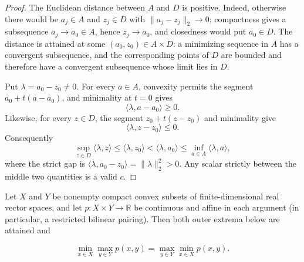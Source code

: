 \begin{proof}
The Euclidean distance between $A$ and $D$ is positive.  Indeed, otherwise
there would be $a_j\in A$ and $z_j\in D$ with
$\lVert a_j-z_j\rVert_2\to0$; compactness gives a subsequence
$a_j\to a_0\in A$, hence $z_j\to a_0$, and closedness would put
$a_0\in D$.  The distance is attained at some
$(a_0,z_0)\in A\times D$: a minimizing sequence in $A$ has a convergent
subsequence, and the corresponding points of $D$ are bounded and therefore
have a convergent subsequence whose limit lies in $D$.

Put $\lambda=a_0-z_0\ne0$.  For every $a\in A$, convexity permits the
segment $a_0+t(a-a_0)$, and minimality at $t=0$ gives
\[
\langle\lambda,a-a_0\rangle\ge0.
\]
Likewise, for every $z\in D$, the segment $z_0+t(z-z_0)$ and minimality
give
\[
\langle\lambda,z-z_0\rangle\le0.
\]
Consequently
\[
\sup_{z\in D}\langle\lambda,z\rangle
\le\langle\lambda,z_0\rangle
<\langle\lambda,a_0\rangle
\le\inf_{a\in A}\langle\lambda,a\rangle,
\]
where the strict gap is
$\langle\lambda,a_0-z_0\rangle=\lVert\lambda\rVert_2^2>0$.
Any scalar strictly between the middle two quantities is a valid $c$.
\end{proof}

\begin{lemma}\label{lem:step-004-compact-minimax}
Let \(X\) and \(Y\) be nonempty compact convex subsets of finite-dimensional
real vector spaces, and let \(p:X\times Y\to\mathbb R\) be continuous and
affine in each argument (in particular, a restricted bilinear pairing).
Then both outer extrema below are attained and

\[
\min_{x\in X}\max_{y\in Y}p(x,y)
=
\max_{y\in Y}\min_{x\in X}p(x,y).
\tag{S4.16}\label{eq:step-004-16}
\]
\end{lemma}

